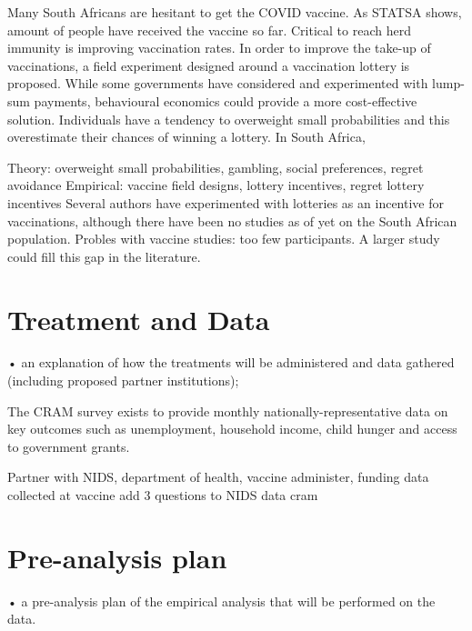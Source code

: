 \documentclass[11pt,preprint, authoryear]{elsarticle}
\numberwithin{equation}{section}
\numberwithin{figure}{section}
\numberwithin{table}{section}
\begin{document}
Many South Africans are hesitant to get the COVID vaccine. As STATSA
shows, amount of people have received the vaccine so far. Critical to
reach herd immunity is improving vaccination rates. In order to improve
the take-up of vaccinations, a field experiment designed around a
vaccination lottery is proposed. While some governments have considered
and experimented with lump-sum payments, behavioural economics could
provide a more cost-effective solution. Individuals have a tendency to
overweight small probabilities and this overestimate their chances of
winning a lottery. In South Africa,

Theory: overweight small probabilities, gambling, social preferences,
regret avoidance Empirical: vaccine field designs, lottery incentives,
regret lottery incentives Several authors have experimented with
lotteries as an incentive for vaccinations, although there have been no
studies as of yet on the South African population. Probles with vaccine
studies: too few participants. A larger study could fill this gap in the
literature.

\hypertarget{treatment-and-data}{%
\section{\texorpdfstring{Treatment and Data
\label{treat}}{Treatment and Data }}\label{treatment-and-data}}

• an explanation of how the treatments will be administered and data
gathered (including proposed partner institutions);

The CRAM survey exists to provide monthly nationally-representative data
on key outcomes such as unemployment, household income, child hunger and
access to government grants.

Partner with NIDS, department of health, vaccine administer, funding
data collected at vaccine add 3 questions to NIDS data cram

\hypertarget{pre-analysis-plan}{%
\section{\texorpdfstring{Pre-analysis plan
\label{pre}}{Pre-analysis plan }}\label{pre-analysis-plan}}

• a pre-analysis plan of the empirical analysis that will be performed
on the data.
\end{document}
